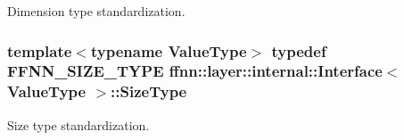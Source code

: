 Dimension type standardization. 

\hypertarget{classffnn_1_1layer_1_1internal_1_1_interface_af0567642f60c65b5e87067226a54174b}{
\subsubsection[{Size\-Type}]{\setlength{\rightskip}{0pt plus 5cm}template$<$typename Value\-Type$>$ typedef {\bf F\-F\-N\-N\-\_\-\-S\-I\-Z\-E\-\_\-\-T\-Y\-P\-E} {\bf ffnn\-::layer\-::internal\-::\-Interface}$<$ Value\-Type $>$\-::{\bf Size\-Type}}}\label{classffnn_1_1layer_1_1internal_1_1_interface_af0567642f60c65b5e87067226a54174b}


Size type standardization. 



